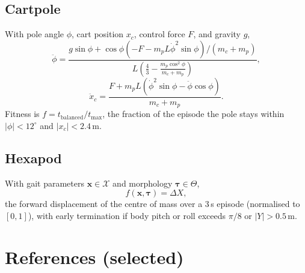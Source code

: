 \documentclass[11pt,a4paper]{article}
\begin{document}
\subsection{Cartpole}
With pole angle $\phi$, cart position $x_{c}$, control force $F$, and
gravity $g$,
\[
\ddot{\phi} = \frac{g \sin \phi + \cos \phi \left(-F - m_{p} L
   \dot{\phi}^{2} \sin \phi\right)/(m_{c} + m_{p})}
   {L \left(\tfrac{4}{3} - \tfrac{m_{p} \cos^{2}
   \phi}{m_{c} + m_{p}}\right)},
\]
\[
\ddot{x}_{c} = \frac{F + m_{p} L \left(\dot{\phi}^{2}
   \sin \phi - \ddot{\phi} \cos \phi\right)}{m_{c} + m_{p}}.
\]
Fitness is $f = t_{\text{balanced}}/t_{\text{max}}$, the fraction of the
episode the pole stays within $|\phi|<12^{\circ}$ and
$|x_{c}|<2.4\,\mathrm{m}$.

\subsection{Hexapod}
With gait parameters $\mathbf{x}\in\mathcal{X}$ and morphology
$\boldsymbol{\tau}\in\Theta$,
\[
f(\mathbf{x},\boldsymbol{\tau}) = \Delta X,
\]
the forward displacement of the centre of mass over a 3\,s episode
(normalised to~$[0,1]$), with early termination if body pitch or roll
exceeds $\pi/8$ or $|Y|>0.5\,\mathrm{m}$.

\section*{References (selected)}
\end{document}
